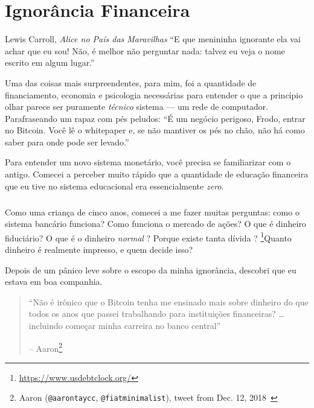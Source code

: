 \chapter{Ignorância Financeira}
\label{les:8}

\begin{chapquote}{Lewis Carroll, \textit{Alice no País das Maravilhas}}
\enquote{E que menininha ignorante ela vai achar que eu sou! 
Não, é melhor não perguntar nada: talvez eu veja o nome escrito em algum lugar.}
\end{chapquote}

Uma das coisas mais surpreendentes, para mim, foi a quantidade de financiamento,
economia e psicologia necessárias para entender o que a princípio
olhar parece ser puramente \textit{técnico} sistema --- um rede de computador.
Parafraseando um rapaz com pés peludos: \enquote{É um negócio perigoso, Frodo, entrar no Bitcoin. 
Você lê o whitepaper e, se não mantiver os pés no chão, não há como saber para onde pode ser levado.}

Para entender um novo sistema monetário, você precisa se familiarizar com o antigo. 
Comecei a perceber muito rápido que a quantidade de educação financeira que eu tive no
sistema educacional era essencialmente \textit{zero}.

\paragraph{}
Como uma criança de cinco anos, comecei a me fazer muitas perguntas: como o
sistema bancário funciona? Como funciona o mercado de ações? O que é dinheiro fiduciário? 
O que é o dinheiro \textit{normal} ? Porque existe tanta dívida ?
\footnote{\url{https://www.usdebtclock.org/}}Quanto dinheiro é realmente
impresso, e quem decide isso?
\newpage

Depois de um pânico leve sobre o escopo da minha ignorância, descobri
que eu estava em boa companhia.

\begin{quotation}\begin{samepage}
\enquote{Não é irônico que o Bitcoin tenha me ensinado mais sobre dinheiro do que todos 
os anos que passei trabalhando para instituições financeiras? \ldots incluindo começar 
minha carreira no banco central}
\begin{flushright} -- Aaron\footnote{Aaron (\texttt{@aarontaycc}, \texttt{@fiatminimalist}), tweet from Dec.
12, 2018~\cite{aarontaycc-tweet}}
\end{flushright}\end{samepage}\end{quotation}

